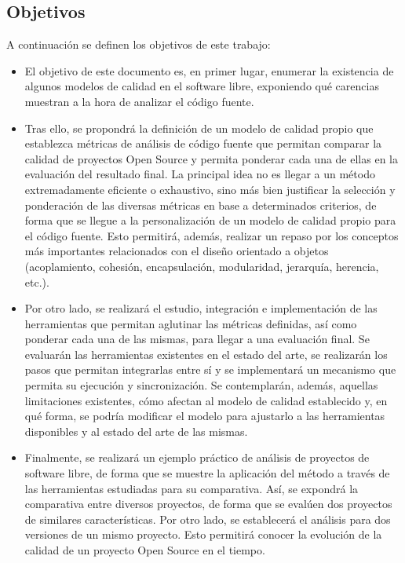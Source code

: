 \documentclass[11pt]{article}
\begin{document}
\subsection{Objetivos}
A continuación se definen los objetivos de este trabajo:
\begin{itemize}
\item{El objetivo de este documento es, en primer lugar, enumerar la existencia de algunos modelos de calidad en el software libre, exponiendo qué carencias muestran a la hora de analizar el código fuente}.
\item{Tras ello, se propondrá la definición de un modelo de calidad propio que establezca métricas de análisis de código fuente que permitan comparar la calidad de proyectos Open Source y permita ponderar cada una de ellas en la evaluación del resultado final. La principal idea no es llegar a un método extremadamente eficiente o exhaustivo, sino más bien justificar la selección y ponderación de las diversas métricas en base a determinados criterios, de forma que se llegue a la personalización de un modelo de calidad propio para el código fuente. Esto permitirá, además, realizar un repaso por los conceptos más importantes relacionados con el diseño orientado a objetos (acoplamiento, cohesión, encapsulación, modularidad, jerarquía, herencia, etc.)}.
\item{Por otro lado, se realizará el estudio, integración e implementación de las herramientas que permitan aglutinar las métricas definidas, así como ponderar cada una de las mismas, para llegar a una evaluación final. Se evaluarán las herramientas existentes en el estado del arte, se realizarán los pasos que permitan integrarlas entre sí y se implementará un mecanismo que permita su ejecución y sincronización. Se contemplarán, además, aquellas limitaciones existentes, cómo afectan al modelo de calidad establecido y, en qué forma, se podría modificar el modelo para ajustarlo a las herramientas disponibles y al estado del arte de las mismas}.
\item{Finalmente, se realizará un ejemplo práctico de análisis de proyectos de software libre, de forma que se muestre la aplicación del método a través de las herramientas estudiadas para su comparativa. Así, se expondrá la comparativa entre diversos proyectos, de forma que se evalúen dos proyectos de similares características. Por otro lado, se establecerá el análisis para dos versiones de un mismo proyecto. Esto permitirá conocer la evolución de la calidad de un proyecto Open Source en el tiempo}.
\end{itemize}
\end{document}
